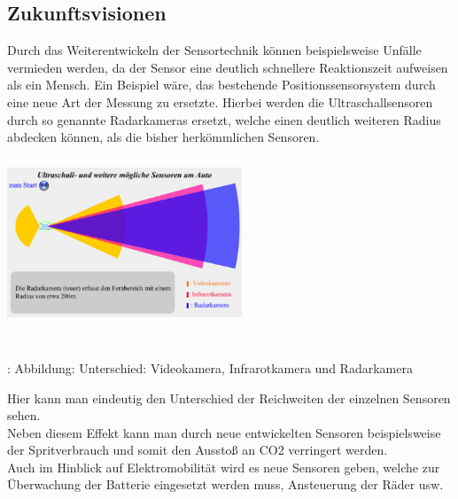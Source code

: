\documentclass{article}
\begin{document}
		
		
		\subsection{Zukunftsvisionen} 
 			Durch das Weiterentwickeln der Sensortechnik können beispielsweise Unfälle vermieden werden, da der Sensor eine deutlich schnellere Reaktionszeit aufweisen als ein Mensch. Ein Beispiel wäre, das bestehende Positionssensorsystem durch eine neue Art der Messung zu ersetzte. Hierbei werden die Ultraschallsensoren durch so genannte Radarkameras ersetzt, welche einen deutlich weiteren Radius abdecken können, als die bisher herkömmlichen Sensoren.\\
 			
 			\begin{center}
 				\includegraphics[width=7cm, height=5cm] {Images/Kapitel5/radarsensor.png}
 				\caption {\\\cite{TS34}: Abbildung: Unterschied: Videokamera, Infrarotkamera und Radarkamera}
 			\end{center}

			\begin{flushleft}
							
				Hier kann man eindeutig den Unterschied der Reichweiten der einzelnen Sensoren sehen.\\
				
				Neben diesem Effekt kann man durch neue entwickelten Sensoren beispielsweise der Spritverbrauch und somit den Ausstoß an CO2 verringert werden.\\
				Auch im Hinblick auf Elektromobilität wird es neue Sensoren geben, welche zur Überwachung der Batterie eingesetzt werden muss, Ansteuerung der Räder usw.
				
			\end{flushleft} 
\end{document}
